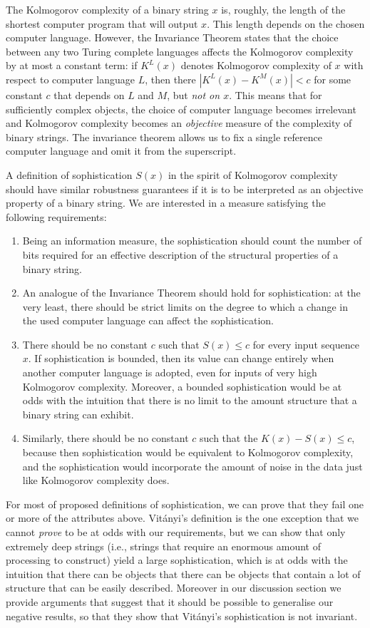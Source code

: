 \documentclass{style/llncs}
\begin{document}
The Kolmogorov complexity of a binary string $x$ is, roughly, the length of the shortest computer program that will output $x$. This length depends on the chosen computer language. However, the Invariance Theorem states that the choice between any two Turing complete languages affects the Kolmogorov complexity by at most a constant term: if $K^L(x)$ denotes Kolmogorov complexity of $x$ with respect to computer language $L$, then there $|K^L(x)-K^M(x)|<c$ for some constant $c$ that depends on $L$ and $M$, but \emph{not on $x$}. This means that for sufficiently complex objects, the choice of computer language becomes irrelevant and Kolmogorov complexity becomes an \emph{objective} measure of the complexity of binary strings. The invariance theorem allows us to fix a single reference computer language and omit it from the superscript.

A definition of sophistication $S(x)$ in the spirit of Kolmogorov complexity should have similar robustness guarantees if it is to be interpreted as an objective property of a binary string. We are interested in a measure satisfying the following requirements:

\begin{enumerate}
\item Being an information measure, the sophistication should count the number of bits required for an effective description of the structural properties of a binary string.
\item An analogue of the Invariance Theorem should hold for sophistication: at the very least, there should be strict limits on the degree to which a change in the used computer language can affect the sophistication.
\item There should be no constant $c$ such that $S(x)\le c$ for every input sequence $x$. If sophistication is bounded, then its value can change entirely when another computer language is adopted, even for inputs of very high Kolmogorov complexity. Moreover, a bounded sophistication would be at odds with the intuition that there is no limit to the amount structure that a binary string can exhibit.
\item Similarly, there should be no constant $c$ such that the $K(x)-S(x)\le c$, because then sophistication would be equivalent to Kolmogorov complexity, and the sophistication would incorporate the amount of noise in the data just like Kolmogorov complexity does.
\end{enumerate}

For most of proposed definitions of sophistication, we can prove that they fail one or more of the attributes above. Vit\'anyi's definition \cite{TODO} is the one exception that we cannot \emph{prove} to be at odds with our requirements, but we can show that only extremely deep strings (i.e., strings that require an enormous amount of processing to construct) yield a large sophistication, which is at odds with the intuition that there can be objects that there can be objects that contain a lot of structure that can be easily described. Moreover in our discussion section we provide arguments that suggest that it should be possible to generalise our negative results, so that they show that Vit\'anyi's sophistication is not invariant.
\end{document}
